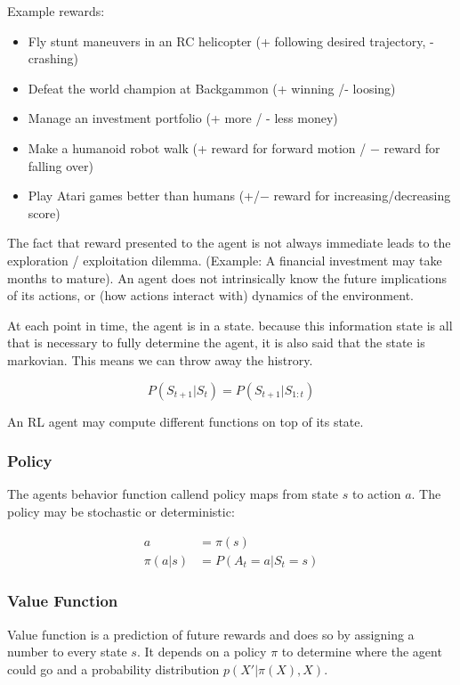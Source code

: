 \documentclass[main]{subfiles}
\begin{document}
Example rewards:

\begin{itemize}
    \item Fly stunt maneuvers in an RC helicopter (+ following desired trajectory, - crashing)
    \item Defeat the world champion at Backgammon (+ winning /- loosing)
    \item Manage an investment portfolio (+ more / -  less money)
    \item Make a humanoid robot walk (+ reward for forward motion / − reward for falling over)
    \item Play Atari games better than humans (+/− reward for increasing/decreasing score)
\end{itemize}

The fact that reward presented to the agent is not always immediate leads to the exploration / exploitation dilemma. (Example: A financial investment may take months to mature). 
An agent does not intrinsically know the future implications of its actions, or (how actions interact with) dynamics of the environment.

At each point in time, the agent is in a state. because this information state is all that is necessary to fully determine the agent, it is also said that the state is markovian. This means we can throw away the histrory.

\begin{equation}
    P(S_{t+1}|S_t) = P(S_{t+1} | S_{1:t})
\end{equation}

An RL agent may compute different functions on top of its state.

\subsubsection{Policy}
The agents behavior function callend policy maps from state $s$ to action $a$. The policy may be stochastic or deterministic:

\begin{align}
    a & = \pi(s) \\
    \pi(a|s) & = P(A_t = a | S_t = s)
\end{align}

\subsubsection{Value Function}
Value function is a prediction of future rewards and does so by assigning a number to every state $s$. It depends on a policy $\pi$ to determine where the agent could go and a probability distribution $p(X'|\pi(X), X)$.
\end{document}
